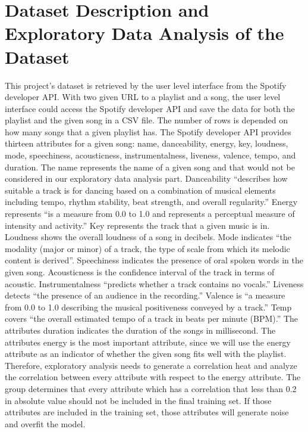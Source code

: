 \documentclass{article}
\begin{document}
\section{Dataset Description and Exploratory Data Analysis of the Dataset}
This project’s dataset is retrieved by the user level interface from the Spotify developer API. With two given URL to a playlist and a song, the user level interface could access the Spotify developer API and save the data for both the playlist and the given song in a CSV file. The number of rows is depended on how many songs that a given playlist has. The Spotify developer API provides thirteen attributes for a given song: name, danceability, energy, key, loudness, mode, speechiness, acousticness, instrumentalness, liveness, valence, tempo, and duration. The name represents the name of a given song and that would not be considered in our exploratory data analysis part. Danceability “describes how suitable a track is for dancing based on a combination of musical elements including tempo, rhythm stability, beat strength, and overall regularity.” Energy represents “is a measure from 0.0 to 1.0 and represents a perceptual measure of intensity and activity.” Key represents the track that a given music is in. Loudness shows the overall loudness of a song in decibels.  Mode indicates “the modality (major or minor) of a track, the type of scale from which its melodic content is derived”. Speechiness indicates the presence of oral spoken words in the given song. Acousticness is the confidence interval of the track in terms of acoustic. Instrumentalness “predicts whether a track contains no vocals.” Liveness detects “the presence of an audience in the recording.” Valence is “a measure from 0.0 to 1.0 describing the musical positiveness conveyed by a track.” Temp covers “the overall estimated tempo of a track in beats per minute (BPM).” The attributes duration indicates the duration of the songs in millisecond. 
The attributes energy is the most important attribute, since we will use the energy attribute as an indicator of whether the given song fits well with the playlist. Therefore, exploratory analysis needs to generate a correlation heat and analyze the correlation between every attribute with respect to the energy attribute. The group determines that every attribute which has a correlation that less than 0.2 in absolute value should not be included in the final training set. If those attributes are included in the training set, those attributes will generate noise and overfit the model.
\end{document}
